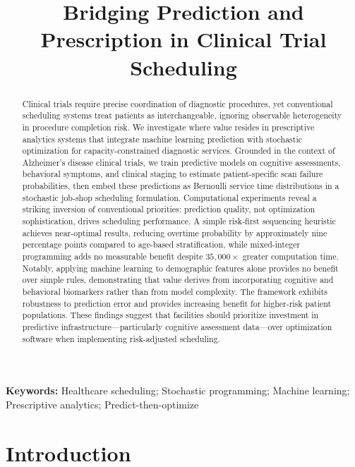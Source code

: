 \documentclass[11pt,a4paper]{article}
\title{Bridging Prediction and Prescription in Clinical Trial Scheduling}
\date{}
\begin{document}
\maketitle

\renewcommand{\thefootnote}{*}
\renewcommand{\thefootnote}{\arabic{footnote}}

\begin{abstract}
Clinical trials require precise coordination of diagnostic procedures, yet conventional scheduling systems treat patients as interchangeable, ignoring observable heterogeneity in procedure completion risk. We investigate where value resides in prescriptive analytics systems that integrate machine learning prediction with stochastic optimization for capacity-constrained diagnostic services. Grounded in the context of Alzheimer's disease clinical trials, we train predictive models on cognitive assessments, behavioral symptoms, and clinical staging to estimate patient-specific scan failure probabilities, then embed these predictions as Bernoulli service time distributions in a stochastic job-shop scheduling formulation. Computational experiments reveal a striking inversion of conventional priorities: prediction quality, not optimization sophistication, drives scheduling performance. A simple risk-first sequencing heuristic achieves near-optimal results, reducing overtime probability by approximately nine percentage points compared to age-based stratification, while mixed-integer programming adds no measurable benefit despite $35{,}000\times$ greater computation time. Notably, applying machine learning to demographic features alone provides no benefit over simple rules, demonstrating that value derives from incorporating cognitive and behavioral biomarkers rather than from model complexity. The framework exhibits robustness to prediction error and provides increasing benefit for higher-risk patient populations. These findings suggest that facilities should prioritize investment in predictive infrastructure---particularly cognitive assessment data---over optimization software when implementing risk-adjusted scheduling.
\end{abstract}

\noindent\textbf{Keywords:} Healthcare scheduling; Stochastic programming; Machine learning; Prescriptive analytics; Predict-then-optimize



\section{Introduction}
\end{document}
